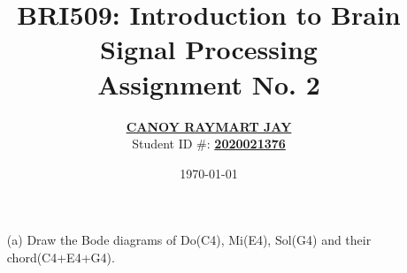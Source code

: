 \documentclass[a4paper, 12pt]{article}
\begin{document}
\title{BRI509: Introduction to Brain Signal Processing \\ Assignment No. 2}
\author{\underline{\textbf{CANOY RAYMART JAY}} \\ Student ID \#: \underline{\textbf{2020021376}}}
\date{\today}
\maketitle

\begin{itemize}
\item[(a)]{Draw the Bode diagrams of Do(C4), Mi(E4), Sol(G4) and their chord(C4+E4+G4).}

\begin{tcolorbox}[enforce breakable, pad at break = 1mm, break at=17cm,title={Source Code}]

\end{tcolorbox}
\end{itemize}
\end{document}
